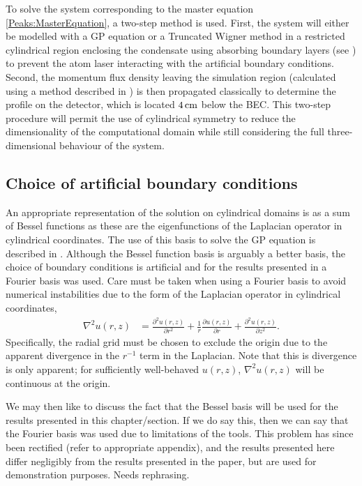 To solve the system corresponding to the master equation \eqref{Peaks:MasterEquation}, a two-step method is used. First, the system will either be modelled with a GP equation or a Truncated Wigner method in a restricted cylindrical region enclosing the condensate using absorbing boundary layers (see ) to prevent the atom laser interacting with the artificial boundary conditions. Second, the momentum flux density leaving the simulation region (calculated using a method described in ) is then propagated classically to determine the profile on the detector, which is located $\unit[4]{cm}$ below the BEC. This two-step procedure will permit the use of cylindrical symmetry to reduce the dimensionality of the computational domain while still considering the full three-dimensional behaviour of the system.

\subsection{Choice of artificial boundary conditions}

An appropriate representation of the solution on cylindrical domains is as a sum of Bessel functions as these are the eigenfunctions of the Laplacian operator in cylindrical coordinates. The use of this basis to solve the GP equation is described in \citep{Ronen:2006}. Although the Bessel function basis is arguably a better basis, the choice of boundary conditions is artificial and for the results presented in \citep{Dall:2009} a Fourier basis was used. Care must be taken when using a Fourier basis to avoid numerical instabilities due to the form of the Laplacian operator in cylindrical coordinates,
\begin{align}
    \nabla^2 u(r, z) &= \frac{\partial^2 u(r, z)}{\partial r^2} + \frac{1}{r}\frac{\partial u(r, z)}{\partial r} + \frac{\partial^2 u(r, z)}{\partial z^2}.
\end{align}
Specifically, the radial grid must be chosen to exclude the origin due to the apparent divergence in the $r^{-1}$ term in the Laplacian. Note that this is divergence is only apparent; for sufficiently well-behaved $u(r, z)$, $\nabla^2 u(r, z)$ will be continuous at the origin.

We may then like to discuss the fact that the Bessel basis will be used for the results presented in this chapter/section. If we do say this, then we can say that the Fourier basis was used due to limitations of the tools. This problem has since been rectified (refer to appropriate appendix), and the results presented here differ negligibly from the results presented in the paper, but are used for demonstration purposes. Needs rephrasing.


